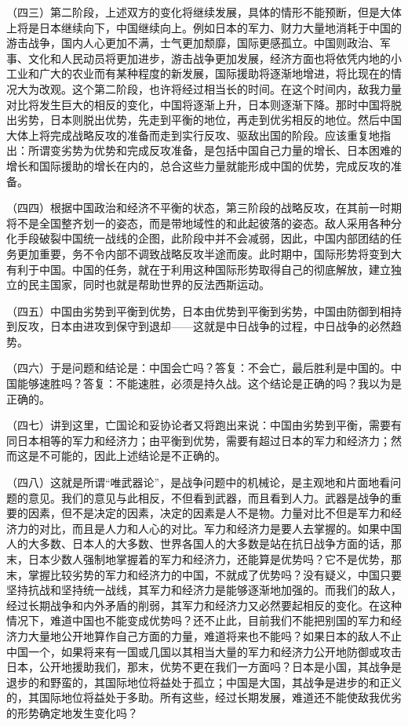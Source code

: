 （四三）第二阶段，上述双方的变化将继续发展，具体的情形不能预断，但是大体上将是日本继续向下，中国继续向上。例如日本的军力、财力大量地消耗于中国的游击战争，国内人心更加不满，士气更加颓靡，国际更感孤立。中国则政治、军事、文化和人民动员将更加进步，游击战争更加发展，经济方面也将依凭内地的小工业和广大的农业而有某种程度的新发展，国际援助将逐渐地增进，将比现在的情况大为改观。这个第二阶段，也许将经过相当长的时间。在这个时间内，敌我力量对比将发生巨大的相反的变化，中国将逐渐上升，日本则逐渐下降。那时中国将脱出劣势，日本则脱出优势，先走到平衡的地位，再走到优劣相反的地位。然后中国大体上将完成战略反攻的准备而走到实行反攻、驱敌出国的阶段。应该重复地指出：所谓变劣势为优势和完成反攻准备，是包括中国自己力量的增长、日本困难的增长和国际援助的增长在内的，总合这些力量就能形成中国的优势，完成反攻的准备。

（四四）根据中国政治和经济不平衡的状态，第三阶段的战略反攻，在其前一时期将不是全国整齐划一的姿态，而是带地域性的和此起彼落的姿态。敌人采用各种分化手段破裂中国统一战线的企图，此阶段中并不会减弱，因此，中国内部团结的任务更加重要，务不令内部不调致战略反攻半途而废。此时期中，国际形势将变到大有利于中国。中国的任务，就在于利用这种国际形势取得自己的彻底解放，建立独立的民主国家，同时也就是帮助世界的反法西斯运动。

（四五）中国由劣势到平衡到优势，日本由优势到平衡到劣势，中国由防御到相持到反攻，日本由进攻到保守到退却——这就是中日战争的过程，中日战争的必然趋势。

（四六）于是问题和结论是：中国会亡吗？答复：不会亡，最后胜利是中国的。中国能够速胜吗？答复：不能速胜，必须是持久战。这个结论是正确的吗？我以为是正确的。

（四七）讲到这里，亡国论和妥协论者又将跑出来说：中国由劣势到平衡，需要有同日本相等的军力和经济力；由平衡到优势，需要有超过日本的军力和经济力；然而这是不可能的，因此上述结论是不正确的。

（四八）这就是所谓“唯武器论”，是战争问题中的机械论，是主观地和片面地看问题的意见。我们的意见与此相反，不但看到武器，而且看到人力。武器是战争的重要的因素，但不是决定的因素，决定的因素是人不是物。力量对比不但是军力和经济力的对比，而且是人力和人心的对比。军力和经济力是要人去掌握的。如果中国人的大多数、日本人的大多数、世界各国人的大多数是站在抗日战争方面的话，那末，日本少数人强制地掌握着的军力和经济力，还能算是优势吗？它不是优势，那末，掌握比较劣势的军力和经济力的中国，不就成了优势吗？没有疑义，中国只要坚持抗战和坚持统一战线，其军力和经济力是能够逐渐地加强的。而我们的敌人，经过长期战争和内外矛盾的削弱，其军力和经济力又必然要起相反的变化。在这种情况下，难道中国也不能变成优势吗？还不止此，目前我们不能把别国的军力和经济力大量地公开地算作自己方面的力量，难道将来也不能吗？如果日本的敌人不止中国一个，如果将来有一国或几国以其相当大量的军力和经济力公开地防御或攻击日本，公开地援助我们，那末，优势不更在我们一方面吗？日本是小国，其战争是退步的和野蛮的，其国际地位将益处于孤立；中国是大国，其战争是进步的和正义的，其国际地位将益处于多助。所有这些，经过长期发展，难道还不能使敌我优劣的形势确定地发生变化吗？

